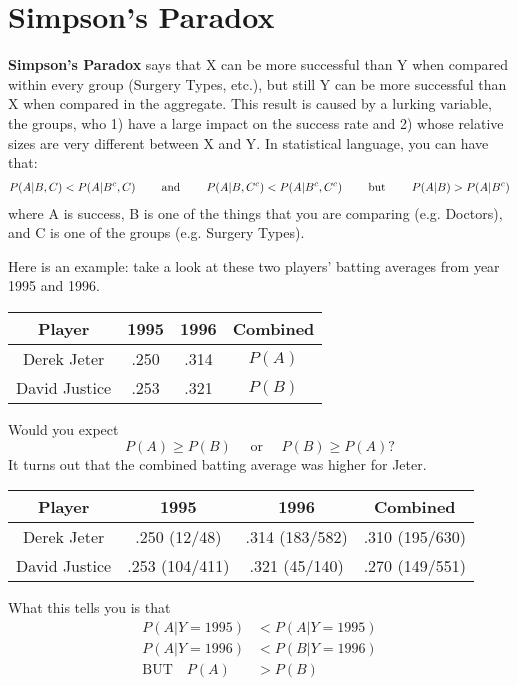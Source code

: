 \documentclass[11pt]{article}
\theoremstyle{definition}
\theoremstyle{remark}
\begin{document}
\section{Simpson's Paradox}
\textbf{Simpson's Paradox} says that X can be more successful than Y when compared within every group (Surgery Types, etc.), but still Y can be more successful than X when compared in the aggregate. This result is caused by a lurking variable, the groups, who 1) have a large impact on the success rate and 2) whose relative sizes are very different between X and Y. In statistical language, you can have that:
\begin{align*}
	P(A|B, C) < P(A|B^c, C) \hskip 0.8cm \textnormal{and}  \hskip 0.8cm P(A|B, C^c) < P(A|B^c, C^c)  \hskip 0.8cm \textnormal{but} \hskip 0.8cm P(A|B) > P(A|B^c)
\end{align*}
where A is success, B is one of the things that you are comparing (e.g. Doctors), and C is one of the groups (e.g. Surgery Types).

Here is an example: take a look at these two players' batting averages from year 1995 and 1996.
    \begin{table}[!h]
        \centering
        \begin{tabular}{|c|c|c|c|} \hline
            Player & 1995 & 1996 & Combined \\  \hline \hline
            Derek Jeter & .250 & .314 & $P(A)$ \\ \hline
            David Justice & .253 & .321 & $P(B)$ \\ \hline
        \end{tabular}
    \end{table}
    Would you expect $$P(A) \geq P(B) \quad \text{ or } \quad P(B) \geq P(A)?$$ It turns out that the combined batting average was higher for Jeter.
    \begin{table}[!h]
        \centering
        \begin{tabular}{|c|c|c|c|} \hline
            Player & 1995 & 1996 & Combined \\  \hline \hline
            Derek Jeter & .250 (12/48) &  .314 (183/582) & .310 (195/630) \\ \hline
            David Justice & .253 (104/411)  & .321 (45/140) & .270 (149/551) \\ \hline
        \end{tabular}
    \end{table}
    
    What this tells you is that \begin{align*}
        P(A|Y=1995) &< P(A|Y=1995) \\
        P(A|Y=1996) &< P(B|Y=1996) \\
        \text{BUT} \quad P(A) &> P(B)
    \end{align*}
\end{document}
